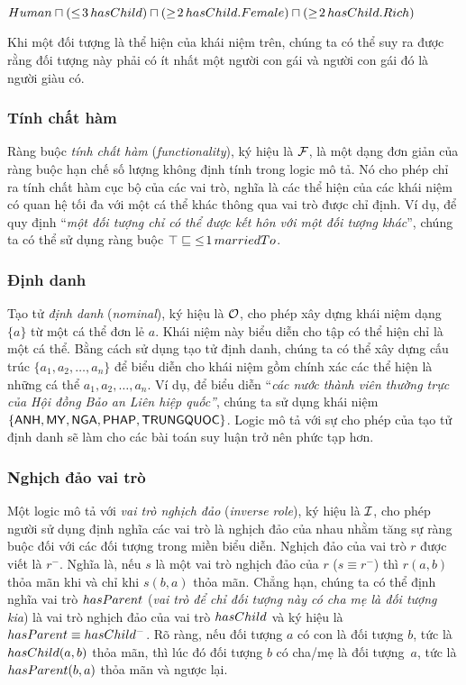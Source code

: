 $Human \sqcap (\leq\!3\,hasChild) \sqcap (\geq\!2\,hasChild.Female) \sqcap (\geq\!2\,hasChild.Rich)$

Khi một đối tượng là thể hiện của khái niệm trên, chúng ta có thể suy ra được rằng đối tượng này phải có ít nhất một người con gái và người con gái đó là người giàu có.

\subsubsection{Tính chất hàm}
\label{sec:Chap1.Functionality}
Ràng buộc {\em tính chất hàm} ({\em functionality}), ký hiệu là $\mathcal{F}$, là một dạng đơn giản của ràng buộc hạn chế số lượng không định tính trong logic mô tả. Nó cho phép chỉ ra tính chất hàm cục bộ của các vai trò, nghĩa là các thể hiện của các khái niệm có quan hệ tối đa với một cá thể khác thông qua vai trò được chỉ định.
Ví dụ, để quy định ``\textit{một đối tượng chỉ có thể được kết hôn với một đối tượng khác}'', chúng ta có thể sử dụng ràng buộc $\top \sqsubseteq\; \leq\!1\,marriedTo$.

\subsubsection{Định danh}
\label{sec:Chap1.Nominal}
Tạo tử {\em định danh} ({\em nominal}), ký hiệu là $\mathcal{O}$, cho phép xây dựng khái niệm dạng $\{a\}$ từ một cá thể đơn lẻ $a$. Khái niệm này biểu diễn cho tập có thể hiện chỉ là một cá thể. Bằng cách sử dụng tạo tử định danh, chúng ta có thể xây dựng cấu trúc $\{a_1, a_2, \ldots, a_n\}$ để biểu diễn cho khái niệm gồm chính xác các thể hiện là những cá thể $a_1, a_2, \ldots, a_n$.
Ví dụ, để biểu diễn ``\textit{các nước thành viên thường trực của Hội đồng Bảo an Liên hiệp quốc''}, chúng ta sử dụng khái niệm $\{\mathsf{ANH}, \mathsf{MY}, \mathsf{NGA}, \mathsf{PHAP}, \mathsf{TRUNGQUOC}\}$.
Logic mô tả với sự cho phép của tạo tử định danh sẽ làm cho các bài toán suy luận trở nên phức tạp hơn.

\subsubsection{Nghịch đảo vai trò}
\label{sec:Chap1.RoleInverse}
Một logic mô tả với {\em vai trò nghịch đảo} ({\em inverse role}), ký hiệu là $\mathcal{I}$, cho phép người sử dụng định nghĩa các vai trò là nghịch đảo của nhau nhằm tăng sự ràng buộc đối với các đối tượng trong miền biểu diễn. Nghịch đảo của vai trò $r$ được viết là $r^-$. Nghĩa là, nếu $s$ là một vai trò nghịch đảo của $r$ ($s \equiv r^-$) thì $r(a, b)$ thỏa mãn khi và chỉ khi $s(b,a)$ thỏa mãn. Chẳng hạn, chúng ta có thể định nghĩa vai trò $hasParent$ ({\em vai trò để chỉ đối tượng này có cha mẹ là đối tượng kia}) là vai trò nghịch đảo của vai trò $hasChild$ và ký hiệu là $hasParent \equiv hasChild^-$. Rõ ràng, nếu đối tượng $a$ có con là đối tượng $b$, tức là $hasChild(a,b)$ thỏa mãn, thì lúc đó đối tượng $b$ có cha/mẹ là đối tượng~$a$, tức là $hasParent(b,a)$ thỏa mãn và ngược lại.

